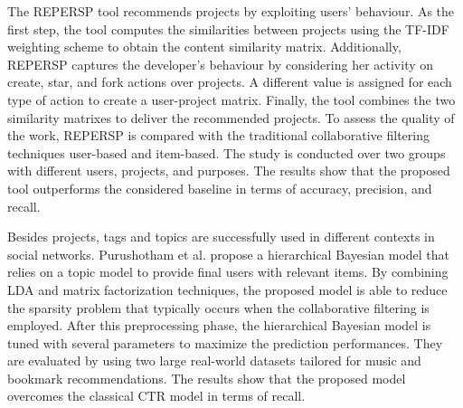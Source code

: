 The REPERSP tool \cite{xu_repersp_2017} recommends \GH projects by exploiting 
users' behaviour. As the first step, the tool computes the similarities between 
projects using the TF-IDF weighting scheme to obtain the content similarity 
matrix. Additionally, REPERSP captures the developer's behaviour by considering 
her activity on \GH \ie create, star, and fork actions over projects. A 
different value is assigned for each type of action to create a user-project 
matrix. Finally, the tool combines the two similarity matrixes to deliver the 
recommended projects. To assess the quality of the work, REPERSP is compared 
with the traditional collaborative filtering techniques \ie user-based and 
item-based. The study is conducted over two groups with different users, 
projects, and purposes. The results show that the proposed tool outperforms the 
considered baseline in terms of accuracy, precision, and recall. 

Besides \GH projects, tags and topics are successfully used in different 
contexts \ie in social networks. Purushotham et al. 
\cite{purushotham_collaborative_nodate} propose a hierarchical Bayesian model 
that relies on a topic model to provide final users with relevant items. By 
combining  LDA and matrix factorization techniques, the proposed model is able 
to reduce the sparsity problem that typically occurs when the collaborative 
filtering is employed. After this preprocessing phase, the hierarchical 
Bayesian model is tuned with several parameters to maximize the prediction 
performances. They are evaluated by using two large real-world datasets 
tailored for music and bookmark recommendations. The results show that the 
proposed model overcomes the classical CTR model in terms of recall. 

